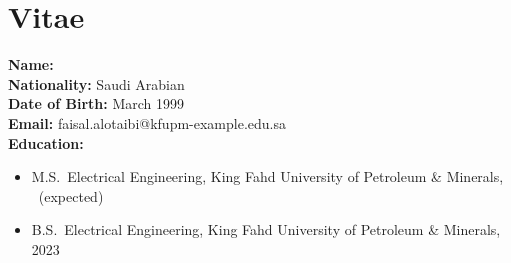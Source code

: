 \chapter*{Vitae}
\noindent
\textbf{Name:} \tauthor\\
\textbf{Nationality:} Saudi Arabian\\
\textbf{Date of Birth:} March 1999\\
\textbf{Email:} faisal.alotaibi@kfupm-example.edu.sa\\[6pt]
\textbf{Education:}
\begin{itemize}[leftmargin=1.4cm]
  \item M.S.\ Electrical Engineering, King Fahd University of Petroleum \& Minerals, \tyear\ (expected)
  \item B.S.\ Electrical Engineering, King Fahd University of Petroleum \& Minerals, 2023
\end{itemize}
